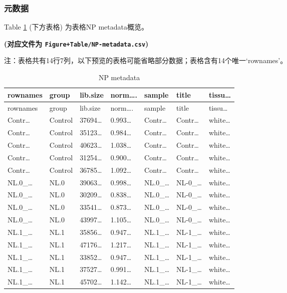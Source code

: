 \documentclass[
]{article}
\begin{document}
\hypertarget{ux5143ux6570ux636e-1}{%
\subsubsection{元数据}\label{ux5143ux6570ux636e-1}}

Table \ref{tab:NP-metadata} (下方表格) 为表格NP metadata概览。

\textbf{(对应文件为 \texttt{Figure+Table/NP-metadata.csv})}

\begin{center}\begin{tcolorbox}[colback=gray!10, colframe=gray!50, width=0.9\linewidth, arc=1mm, boxrule=0.5pt]注：表格共有14行7列，以下预览的表格可能省略部分数据；表格含有14个唯一`rownames'。
\end{tcolorbox}
\end{center}

\begin{longtable}[]{@{}lllllll@{}}
\caption{\label{tab:NP-metadata}NP metadata}\tabularnewline
\toprule
rownames & group & lib.size & norm\ldots. & sample & title & tissu\ldots{}\tabularnewline
\midrule
\endfirsthead
\toprule
rownames & group & lib.size & norm\ldots. & sample & title & tissu\ldots{}\tabularnewline
\midrule
\endhead
Contr\ldots{} & Control & 37694\ldots{} & 0.993\ldots{} & Contr\ldots{} & Contr\ldots{} & white\ldots{}\tabularnewline
Contr\ldots{} & Control & 35123\ldots{} & 0.984\ldots{} & Contr\ldots{} & Contr\ldots{} & white\ldots{}\tabularnewline
Contr\ldots{} & Control & 40623\ldots{} & 1.038\ldots{} & Contr\ldots{} & Contr\ldots{} & white\ldots{}\tabularnewline
Contr\ldots{} & Control & 31254\ldots{} & 0.900\ldots{} & Contr\ldots{} & Contr\ldots{} & white\ldots{}\tabularnewline
Contr\ldots{} & Control & 36785\ldots{} & 1.092\ldots{} & Contr\ldots{} & Contr\ldots{} & white\ldots{}\tabularnewline
NL.0\_\ldots{} & NL.0 & 39063\ldots{} & 0.998\ldots{} & NL.0\_\ldots{} & NL-0\_\ldots{} & white\ldots{}\tabularnewline
NL.0\_\ldots{} & NL.0 & 30209\ldots{} & 0.838\ldots{} & NL.0\_\ldots{} & NL-0\_\ldots{} & white\ldots{}\tabularnewline
NL.0\_\ldots{} & NL.0 & 33541\ldots{} & 0.873\ldots{} & NL.0\_\ldots{} & NL-0\_\ldots{} & white\ldots{}\tabularnewline
NL.0\_\ldots{} & NL.0 & 43997\ldots{} & 1.105\ldots{} & NL.0\_\ldots{} & NL-0\_\ldots{} & white\ldots{}\tabularnewline
NL.1\_\ldots{} & NL.1 & 35856\ldots{} & 0.947\ldots{} & NL.1\_\ldots{} & NL-1\_\ldots{} & white\ldots{}\tabularnewline
NL.1\_\ldots{} & NL.1 & 47176\ldots{} & 1.217\ldots{} & NL.1\_\ldots{} & NL-1\_\ldots{} & white\ldots{}\tabularnewline
NL.1\_\ldots{} & NL.1 & 33852\ldots{} & 0.947\ldots{} & NL.1\_\ldots{} & NL-1\_\ldots{} & white\ldots{}\tabularnewline
NL.1\_\ldots{} & NL.1 & 37527\ldots{} & 0.991\ldots{} & NL.1\_\ldots{} & NL-1\_\ldots{} & white\ldots{}\tabularnewline
NL.1\_\ldots{} & NL.1 & 45702\ldots{} & 1.142\ldots{} & NL.1\_\ldots{} & NL-1\_\ldots{} & white\ldots{}\tabularnewline
\bottomrule
\end{longtable}
\end{document}
